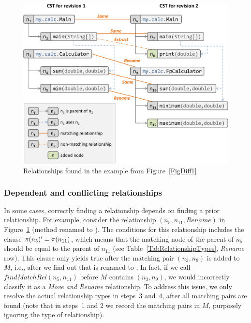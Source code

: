 \begin{figure}[htb]
\centering
\includegraphics[width=1.0\linewidth]{img/relationshipDiff1.pdf}
\caption{Relationships found in the example from Figure~\ref{FigDiff1}}
\label{FigRelationships1}
\end{figure}


\subsubsection{Dependent and conflicting relationships}
\label{SecDependentConflictingRel}

In some cases, correctly finding a relationship depends on finding a prior relationship.
For example, consider the relationship $(n_5, n_{11}, Rename)$ in Figure~\ref{FigRelationships1} (method  renamed to ).
The conditions for this relationship includes the clause $\operatorname{\pi}(n_5)' = \operatorname{\pi}(n_{11})$, which means that the matching node of the parent of $n_5$ should be equal to the parent of $n_{11}$ (see Table~\ref{TabRelationshipTypes}, \textit{Rename} row).
This clause only yields true after the matching pair $(n_3, n_9)$ is added to $M$, i.e., after we find out that  is renamed to .
In fact, if we call $\mathit{findMatchRel}(n_5, n_{11})$ before $M$ contains $(n_3, n_9)$, we would incorrectly classify it as a \textit{Move and Rename} relationship.
To address this issue, we only resolve the actual relationship types in steps~3 and~4, after all matching pairs are found (note that in steps~1 and 2 we record the matching pairs in $M$, purposely ignoring the type of relationship).

